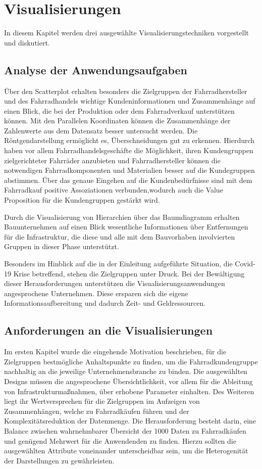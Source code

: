\documentclass[usegeometry=true]{scrartcl}
\begin{document}
\section{Visualisierungen}
In diesem Kapitel werden drei ausgewählte Visualisierungstechniken vorgestellt und diskutiert.
\subsection{Analyse der Anwendungsaufgaben}
Über den Scatterplot erhalten besonders die Zielgruppen der Fahrradhersteller und des Fahrradhandels wichtige Kundeninformationen und Zusammenhänge auf einen Blick, die bei der Produktion oder dem Fahrradverkauf unterstützen können. 
Mit den Parallelen Koordinaten können die Zusammenhänge der Zahlenwerte aus dem Datensatz besser untersucht werden. Die Röntgendarstellung ermöglicht es, Überschneidungen gut zu erkennen. Hierdurch haben vor allem Fahrradhandelsgeschäfte die Möglichkeit, ihren Kundengruppen zielgerichteter Fahrräder anzubieten und Fahrradhersteller können die notwendigen Fahrradkomponenten und Materialien besser auf die Kundegruppen abstimmen.
Über das genaue Eingehen auf die Kundenbedürfnisse sind mit dem Fahrradkauf positive Assoziationen verbunden,wodurch auch die Value Proposition für die Kundengruppen gestärkt wird. 


Durch die Visualisierung von Hierarchien über das Baumdiagramm erhalten Bauunternehmen auf einen Blick wesentliche Informationen über Entfernungen für die Infrastruktur, die diese und alle mit dem Bauvorhaben involvierten Gruppen in dieser Phase unterstützt.

Besonders im Hinblick auf die in der Einleitung aufgeführte Situation, die Covid-19 Krise betreffend, stehen die Zielgruppen unter Druck. Bei der Bewältigung dieser Herausforderungen unterstützen die Visualisierungsanwendungen angesprochene Unternehmen. Diese ersparen sich die eigene Informationsaufbereitung und dadurch Zeit- und Geldressourcen. 
\subsection{Anforderungen an die Visualisierungen}
Im ersten Kapitel wurde die eingehende Motivation beschrieben, für die Zielgruppen bestmögliche Anhaltspunkte zu finden, um die Fahrradkundengruppe nachhaltig an die jeweilige Unternehmensbranche zu binden. Die ausgewählten Designs müssen die angesprochene Übersichtlichkeit, vor allem für die Ableitung von Infrastrukturmaßnahmen, über erhobene Parameter einhalten. Des Weiteren liegt ihr Wertversprechen für die Zielgruppen im Aufzeigen von Zusammenhängen, welche zu Fahrradkäufen führen und der Komplexitätsreduktion der Datenmenge. Die Herausforderung besteht darin, eine Balance zwischen wahrnehmbarer Übersicht der 1000 Daten zu Fahrradkäufen und genügend Mehrwert für die Anwendenden zu finden. Hierzu sollten die ausgewählten Attribute voneinander unterscheidbar sein, um die Heterogenität der Darstellungen zu gewährleisten.
\end{document}
